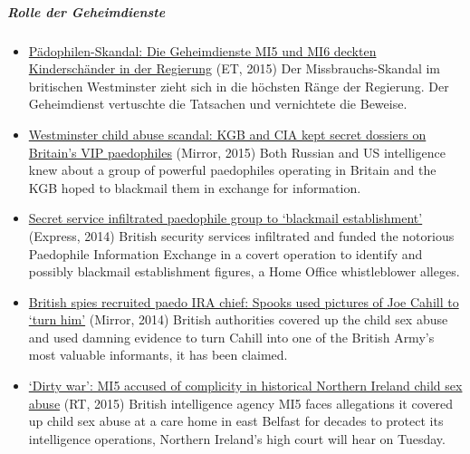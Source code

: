 \hypertarget{rolle-der-geheimdienste}{%
\subparagraph{\texorpdfstring{\textbf{Rolle der
Geheimdienste}}{Rolle der Geheimdienste}}\label{rolle-der-geheimdienste}}

\begin{itemize}
\tightlist
\item
  \href{https://web.archive.org/web/20171111215623/http://www.epochtimes.de/politik/europa/paedophilen-skandal-die-geheimdienste-mi5-und-m16-deckten-kinderschaender-in-der-regierung-a1256792.html}{Pädophilen-Skandal:
  Die Geheimdienste MI5 und MI6 deckten Kinderschänder in der Regierung}
  (ET, 2015) Der Missbrauchs-Skandal im britischen Westminster zieht
  sich in die höchsten Ränge der Regierung. Der Geheimdienst vertuschte
  die Tatsachen und vernichtete die Beweise.
\item
  \href{https://www.mirror.co.uk/news/uk-news/westminster-child-abuse-scandal-kgb-5080120}{Westminster
  child abuse scandal: KGB and CIA kept secret dossiers on Britain's VIP
  paedophiles} (Mirror, 2015) Both Russian and US intelligence knew
  about a group of powerful paedophiles operating in Britain and the KGB
  hoped to blackmail them in exchange for information.
\item
  \href{https://www.express.co.uk/news/uk/485529/Special-Branch-funded-Paedophile-Information-Exchange-says-Home-Office-whistleblower}{Secret
  service infiltrated paedophile group to `blackmail establishment'}
  (Express, 2014) British security services infiltrated and funded the
  notorious Paedophile Information Exchange in a covert operation to
  identify and possibly blackmail establishment figures, a Home Office
  whistleblower alleges.
\item
  \href{https://www.mirror.co.uk/news/uk-news/british-spies-recruited-paedo-ira-4466798}{British
  spies recruited paedo IRA chief: Spooks used pictures of Joe Cahill to
  `turn him'} (Mirror, 2014) British authorities covered up the child
  sex abuse and used damning evidence to turn Cahill into one of the
  British Army's most valuable informants, it has been claimed.
\item
  \href{https://www.rt.com/uk/232691-abuse-cover-up-mi5/}{`Dirty war​':
  MI5 accused of complicity in historical Northern Ireland child sex
  abuse} (RT, 2015) British intelligence agency MI5 faces allegations it
  covered up child sex abuse at a care home in east Belfast for decades
  to protect its intelligence operations, Northern Ireland's high court
  will hear on Tuesday.
\end{itemize}

